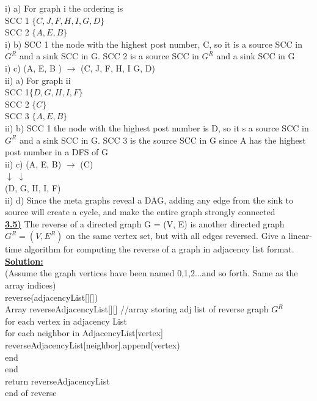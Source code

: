 \documentclass{article}
\begin{document}
\noindent i) a) For graph i the ordering is \\
SCC 1 $\{C, J, F, H, I, G, D\}$\\ 
SCC 2 $\{A, E, B\}$ \\

\noindent i) b) SCC 1 the node with the highest post number, C, so it is a source SCC in $G^R$ and a sink SCC in G. SCC 2 is a source SCC in $G^R$ and a sink SCC in G \\

\noindent i) c) (A, E, B ) $\rightarrow$ (C, J, F, H, I G, D)\\

\noindent ii) a) For graph ii \\
SCC 1$\{D, G, H, I, F\}$ \\
SCC 2 $\{C\}$ \\
SCC 3 $\{A, E, B\}$\\

\noindent ii) b) SCC 1 the node with the highest post number is D, so it s a source SCC in $G^R$ and a sink SCC in G. SCC 3 is the source SCC in G since A has the highest post number in a DFS of G\\

\noindent ii) c) (A, E, B) $\rightarrow$ (C)\\
\indent \indent $\downarrow$ \indent \indent \indent$\downarrow$ \\
\indent \indent (D, G, H, I, F) \\

\noindent ii) d) Since the meta graphs reveal a DAG, adding any edge from the sink to source will create a cycle, and make the entire graph strongly connected \\

\vspace{.2in}
\noindent \textbf{\underline{3.5)}} The reverse of a directed graph G = (V, E) is another directed graph $G^R = (V, E^R)$ on the same vertex set, but with all edges reversed. Give a linear-time algorithm for computing the reverse of a graph in adjacency list format. \\

\noindent \textbf{\underline{Solution:}}  \\
\noindent *(Assume the graph vertices have been named 0,1,2...and so forth. Same as the array indices) \\

\noindent reverse(adjacencyList[][]) \\
\indent Array reverseAdjacencyList[][] //array storing adj list of reverse graph $G^R$ \\
\indent for each vertex in adjacency List \\
\indent \indent for each neighbor in AdjacencyList[vertex] \\
\indent \indent \indent reverseAdjacencyList[neighbor].append(vertex) \\
\indent \indent end \\
\indent end \\
\indent return reverseAdjacencyList \\
\noindent end of reverse
\end{document}
